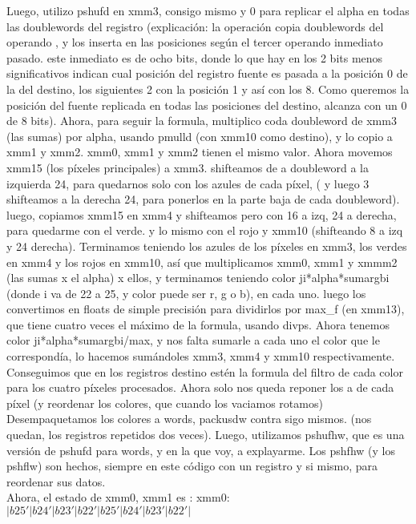 \documentclass[a4paper]{article}
\begin{document}
Luego, utilizo pshufd en xmm3, consigo mismo y 0 para replicar el alpha en todas las doublewords del registro 
\hfill \break
(explicación: la operación copia doublewords del operando , y los inserta en las posiciones   según el tercer operando inmediato pasado. este inmediato es de ocho bits, donde lo que hay en los 2  bits menos significativos  indican cual posición del registro fuente es pasada a la posición 0 de la del destino, los siguientes 2 con la posición 1 y así con los 8. Como queremos la posición del fuente replicada en todas las posiciones del destino, alcanza con un 0 de 8 bits).
\hfill \break
Ahora, para seguir la formula, multiplico coda doubleword de xmm3 (las sumas) por alpha, usando pmulld (con xmm10 como destino), y lo copio a xmm1 y xmm2. xmm0, xmm1 y xmm2 tienen el mismo valor.
\hfill \break
Ahora movemos xmm15 (los píxeles principales) a xmm3. shifteamos de a doubleword a la izquierda 24, para quedarnos solo con los azules de cada píxel,  ( y luego 3 shifteamos a la derecha 24, para ponerlos en la parte baja de cada doubleword).  luego, copiamos xmm15 en xmm4 y shifteamos pero con 16 a izq, 24 a derecha, para quedarme con el verde. y lo mismo con el rojo y xmm10 (shifteando 8 a izq y 24 derecha).
\hfill \break
Terminamos  teniendo los azules de los píxeles en xmm3, los verdes en xmm4 y los rojos en xmm10, así que multiplicamos xmm0, xmm1 y xmmm2 (las sumas x el alpha) x ellos, y terminamos teniendo color ji*alpha*sumargbi 
(donde i va de 22 a 25, y color puede ser r, g o b), en cada uno.  luego los convertimos en floats de simple precisión para dividirlos por max_f (en xmm13), que tiene cuatro veces el máximo de la formula, usando divps.
\hfill \break
Ahora tenemos color ji*alpha*sumargbi/max, y nos falta sumarle a cada uno el color que le correspondía, lo hacemos sumándoles xmm3, xmm4 y xmm10 respectivamente. Conseguimos que en los registros destino estén la formula del filtro de cada color para los cuatro píxeles procesados. 
\hfill \break
Ahora solo nos queda reponer los a de cada píxel (y reordenar los colores, que cuando los vaciamos rotamos) Desempaquetamos los colores a words, packusdw contra sigo mismos. (nos quedan, los registros repetidos dos veces). Luego, utilizamos pshufhw, que es una versión de pshufd para words, y en la que voy, a explayarme. 
\hfill \break
Los pshfhw (y los pshflw) son hechos, siempre en este código con un registro y si mismo, para reordenar sus datos.
\hfill \break
\\
Ahora, el estado de xmm0, xmm1 es :
\hfill \break
xmm0: $|b25'|b24'|b23'|b22'|b25'|b24'|b23'|b22'|$
\end{document}
